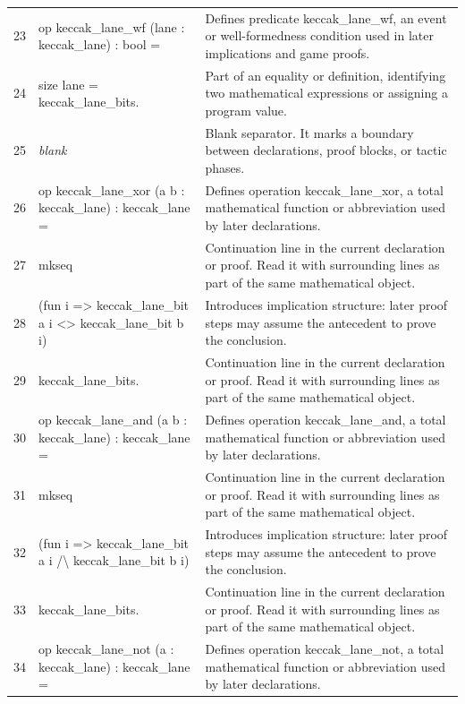 \documentclass[10pt]{article}
\begin{document}
\begin{longtable}{r L{0.53\textwidth} L{0.37\textwidth}}
23 & {\ttfamily\scriptsize op keccak\_lane\_wf (lane : keccak\_lane) : bool =} & Defines predicate keccak\_lane\_wf, an event or well-formedness condition used in later implications and game proofs. \\
24 & {\ttfamily\scriptsize   size lane = keccak\_lane\_bits.} & Part of an equality or definition, identifying two mathematical expressions or assigning a program value. \\
25 & {\ttfamily\scriptsize \emph{blank}} & Blank separator.  It marks a boundary between declarations, proof blocks, or tactic phases. \\
26 & {\ttfamily\scriptsize op keccak\_lane\_xor (a b : keccak\_lane) : keccak\_lane =} & Defines operation keccak\_lane\_xor, a total mathematical function or abbreviation used by later declarations. \\
27 & {\ttfamily\scriptsize   mkseq} & Continuation line in the current declaration or proof.  Read it with surrounding lines as part of the same mathematical object. \\
28 & {\ttfamily\scriptsize     (fun i => keccak\_lane\_bit a i <> keccak\_lane\_bit b i)} & Introduces implication structure: later proof steps may assume the antecedent to prove the conclusion. \\
29 & {\ttfamily\scriptsize     keccak\_lane\_bits.} & Continuation line in the current declaration or proof.  Read it with surrounding lines as part of the same mathematical object. \\
30 & {\ttfamily\scriptsize op keccak\_lane\_and (a b : keccak\_lane) : keccak\_lane =} & Defines operation keccak\_lane\_and, a total mathematical function or abbreviation used by later declarations. \\
31 & {\ttfamily\scriptsize   mkseq} & Continuation line in the current declaration or proof.  Read it with surrounding lines as part of the same mathematical object. \\
32 & {\ttfamily\scriptsize     (fun i => keccak\_lane\_bit a i /\textbackslash{} keccak\_lane\_bit b i)} & Introduces implication structure: later proof steps may assume the antecedent to prove the conclusion. \\
33 & {\ttfamily\scriptsize     keccak\_lane\_bits.} & Continuation line in the current declaration or proof.  Read it with surrounding lines as part of the same mathematical object. \\
34 & {\ttfamily\scriptsize op keccak\_lane\_not (a : keccak\_lane) : keccak\_lane =} & Defines operation keccak\_lane\_not, a total mathematical function or abbreviation used by later declarations. \\

\end{longtable}
\end{document}

